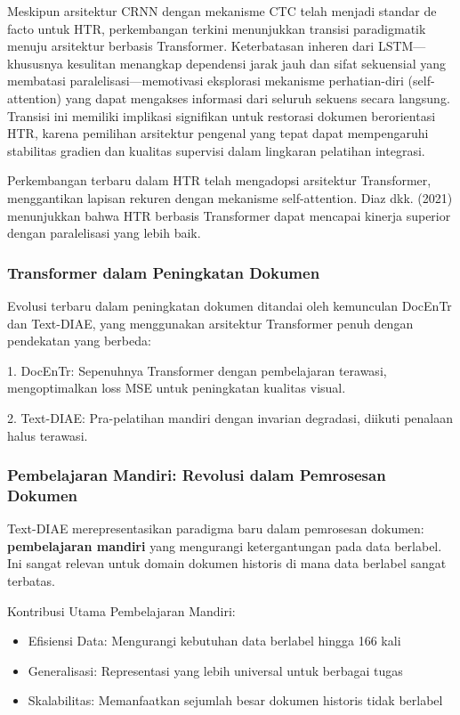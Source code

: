 \documentclass[12pt,a4paper]{article}
\begin{document}
\vspace{1.5ex}

Meskipun arsitektur CRNN dengan mekanisme CTC telah menjadi standar de facto untuk HTR, perkembangan terkini menunjukkan transisi paradigmatik menuju arsitektur berbasis Transformer. Keterbatasan inheren dari LSTM—khususnya kesulitan menangkap dependensi jarak jauh dan sifat sekuensial yang membatasi paralelisasi—memotivasi eksplorasi mekanisme perhatian-diri (self-attention) yang dapat mengakses informasi dari seluruh sekuens secara langsung. Transisi ini memiliki implikasi signifikan untuk restorasi dokumen berorientasi HTR, karena pemilihan arsitektur pengenal yang tepat dapat mempengaruhi stabilitas gradien dan kualitas supervisi dalam lingkaran pelatihan integrasi.

Perkembangan terbaru dalam HTR telah mengadopsi arsitektur Transformer, menggantikan lapisan rekuren dengan mekanisme self-attention. Diaz dkk. (2021) menunjukkan bahwa HTR berbasis Transformer dapat mencapai kinerja superior dengan paralelisasi yang lebih baik.

\subsubsection{Transformer dalam Peningkatan Dokumen}
\label{subsubsec:transformer-dokumen}

Evolusi terbaru dalam peningkatan dokumen ditandai oleh kemunculan DocEnTr dan Text-DIAE, yang menggunakan arsitektur Transformer penuh dengan pendekatan yang berbeda:

1. DocEnTr: Sepenuhnya Transformer dengan pembelajaran terawasi, mengoptimalkan loss MSE untuk peningkatan kualitas visual.

2. Text-DIAE: Pra-pelatihan mandiri dengan invarian degradasi, diikuti penalaan halus terawasi.

\subsubsection{Pembelajaran Mandiri: Revolusi dalam Pemrosesan Dokumen}
\label{subsubsec:pembelajaran-mandiri}

Text-DIAE merepresentasikan paradigma baru dalam pemrosesan dokumen: \textbf{pembelajaran mandiri} yang mengurangi ketergantungan pada data berlabel. Ini sangat relevan untuk domain dokumen historis di mana data berlabel sangat terbatas.

Kontribusi Utama Pembelajaran Mandiri:
\begin{itemize}
 \item Efisiensi Data: Mengurangi kebutuhan data berlabel hingga 166 kali
 \item Generalisasi: Representasi yang lebih universal untuk berbagai tugas
 \item Skalabilitas: Memanfaatkan sejumlah besar dokumen historis tidak berlabel
\end{itemize}
\end{document}
